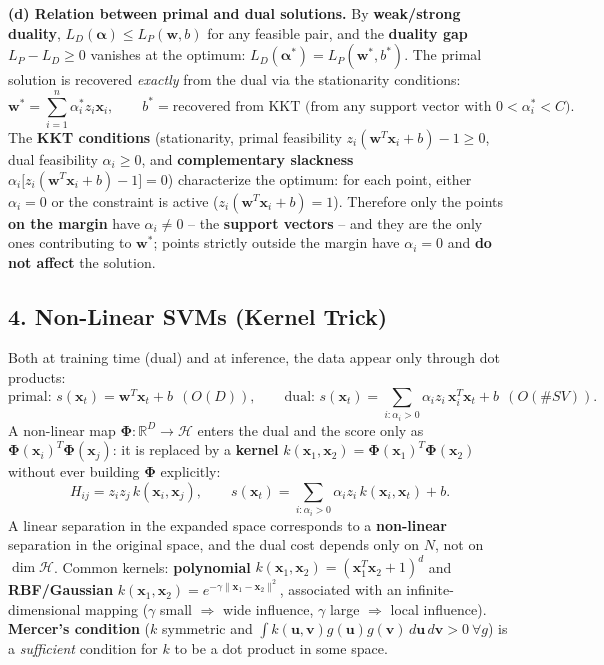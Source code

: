 \textbf{(d) Relation between primal and dual solutions.} By \textbf{weak/strong duality}, $L_D(\boldsymbol\alpha)\le L_P(\mathbf{w},b)$ for any feasible pair, and the \textbf{duality gap} $L_P-L_D\ge0$ vanishes at the optimum: $L_D(\boldsymbol\alpha^*)=L_P(\mathbf{w}^*,b^*)$. The primal solution is recovered \emph{exactly} from the dual via the stationarity conditions:
\[
\mathbf{w}^*=\sum_{i=1}^n\alpha_i^*z_i\mathbf{x}_i,\qquad
b^*=\text{recovered from KKT (from any support vector with }0<\alpha_i^*<C\text{)}.
\]
The \textbf{KKT conditions} (stationarity, primal feasibility $z_i(\mathbf{w}^T\mathbf{x}_i+b)-1\ge0$, dual feasibility $\alpha_i\ge0$, and \textbf{complementary slackness} $\alpha_i\big[z_i(\mathbf{w}^T\mathbf{x}_i+b)-1\big]=0$) characterize the optimum: for each point, either $\alpha_i=0$ or the constraint is active ($z_i(\mathbf{w}^T\mathbf{x}_i+b)=1$). Therefore only the points \textbf{on the margin} have $\alpha_i\ne0$ -- the \textbf{support vectors} -- and they are the only ones contributing to $\mathbf{w}^*$; points strictly outside the margin have $\alpha_i=0$ and \textbf{do not affect} the solution.

\subsection*{4. Non-Linear SVMs (Kernel Trick)}

Both at training time (dual) and at inference, the data appear only through dot products:
\[
\text{primal: } s(\mathbf{x}_t)=\mathbf{w}^T\mathbf{x}_t+b\ \ (O(D)),\qquad
\text{dual: } s(\mathbf{x}_t)=\sum_{i:\alpha_i>0}\alpha_iz_i\,\mathbf{x}_i^T\mathbf{x}_t+b\ \ (O(\#SV)).
\]
A non-linear map $\boldsymbol\Phi:\mathbb{R}^D\to\mathcal{H}$ enters the dual and the score only as $\boldsymbol\Phi(\mathbf{x}_i)^T\boldsymbol\Phi(\mathbf{x}_j)$: it is replaced by a \textbf{kernel} $k(\mathbf{x}_1,\mathbf{x}_2)=\boldsymbol\Phi(\mathbf{x}_1)^T\boldsymbol\Phi(\mathbf{x}_2)$ without ever building $\boldsymbol\Phi$ explicitly:
\[
H_{ij}=z_iz_j\,k(\mathbf{x}_i,\mathbf{x}_j),\qquad s(\mathbf{x}_t)=\sum_{i:\alpha_i>0}\alpha_iz_i\,k(\mathbf{x}_i,\mathbf{x}_t)+b .
\]
A linear separation in the expanded space corresponds to a \textbf{non-linear} separation in the original space, and the dual cost depends only on $N$, not on $\dim\mathcal{H}$. Common kernels: \textbf{polynomial} $k(\mathbf{x}_1,\mathbf{x}_2)=(\mathbf{x}_1^T\mathbf{x}_2+1)^d$ and \textbf{RBF/Gaussian} $k(\mathbf{x}_1,\mathbf{x}_2)=e^{-\gamma\|\mathbf{x}_1-\mathbf{x}_2\|^2}$, associated with an infinite-dimensional mapping ($\gamma$ small $\Rightarrow$ wide influence, $\gamma$ large $\Rightarrow$ local influence). \textbf{Mercer's condition} ($k$ symmetric and $\int k(\mathbf{u},\mathbf{v})g(\mathbf{u})g(\mathbf{v})\,d\mathbf{u}\,d\mathbf{v}>0\ \forall g$) is a \emph{sufficient} condition for $k$ to be a dot product in some space.

